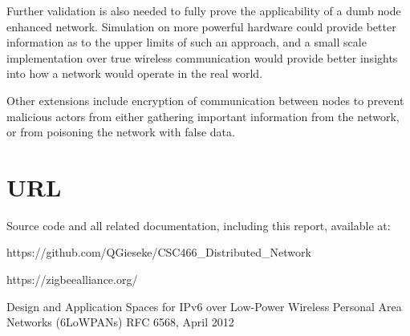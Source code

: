 \documentclass{article}
\begin{document}
Further validation is also needed to fully prove the applicability of a dumb node enhanced network. Simulation on more powerful hardware could provide better information as to the upper limits of such an approach, and a small scale implementation over true wireless communication would provide better insights into how a network would operate in the real world. 

Other extensions include encryption of communication between nodes to prevent malicious actors from either gathering important information from the network, or from poisoning the network with false data. 

\section{URL}
Source code and all related documentation, including this report, available at:

https://github.com/QGieseke/CSC466\_Distributed\_Network

\begin{thebibliography}{2}
	 https://zigbeealliance.org/
	
	 Design and Application Spaces for IPv6 over Low-Power Wireless Personal Area Networks (6LoWPANs) RFC 6568, April 2012

\end{thebibliography}
\end{document}
